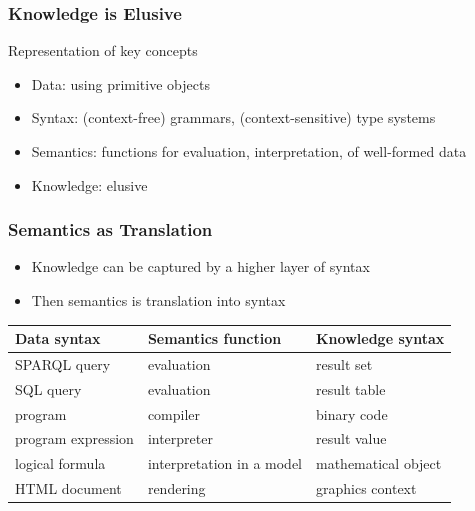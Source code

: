 \begin{frame}\frametitle{Knowledge is Elusive}
Representation of key concepts 
\begin{itemize}
 \item Data: using primitive objects
 \item Syntax: (context-free) grammars, (context-sensitive) type systems
 \item Semantics: functions for evaluation, interpretation, of well-formed data
 \item Knowledge: elusive
\end{itemize}
\end{frame}

\begin{frame}\frametitle{Semantics as Translation}
\begin{itemize}
\item Knowledge can be captured by a higher layer of syntax
\item Then semantics is translation into syntax
\end{itemize}

\begin{center}
\begin{tabular}{l|l|l}
Data syntax & Semantics function & Knowledge syntax \\
\hline
SPARQL query & evaluation & result set \\
SQL query & evaluation & result table \\
program & compiler & binary code \\
program expression & interpreter & result value \\ 
logical formula & interpretation in a model & mathematical object \\
HTML document & rendering & graphics context
\end{tabular}
\end{center}
\end{frame}

